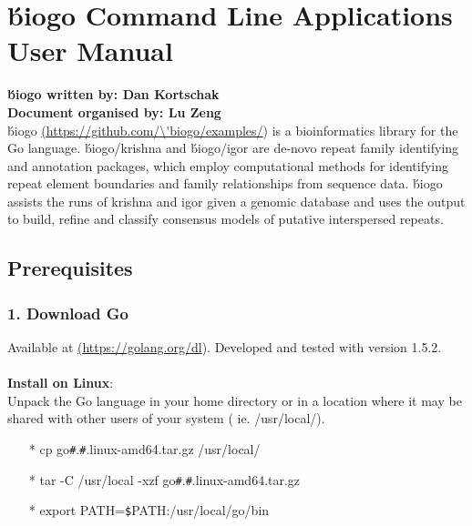 \documentclass[12pt]{report}
\begin{document}
 \sloppy

\author{Author Name}
\date{Day Month Year}


\section*{\'biogo Command Line Applications User Manual}
\textbf{\'biogo written by: Dan Kortschak} \\
\textbf{Document organised by: Lu Zeng} \\

\'biogo \href{<url>}(\url{https://github.com/\'biogo/examples/}) is a bioinformatics library for the Go language. \'biogo/krishna and \'biogo/igor are de-novo repeat family identifying and annotation packages, which employ computational methods for identifying repeat element boundaries and family relationships from sequence data. \'biogo assists the runs of krishna and igor given a genomic database and uses the output to build, refine and classify consensus models of putative interspersed repeats. 


\subsection*{{Prerequisites}}

\subsubsection{1. Download Go }
Available at \href{<url>} (\url{https://golang.org/dl}). Developed and tested with version 1.5.2. \\\\
\textbf{Install on Linux}: \\
Unpack the Go language in your home directory or in a location where it may be shared with other users of your system ( ie. /usr/local/).

\begin{enumerate}
	\item[*] cp go\texttt{\#}.\texttt{\#}.linux-amd64.tar.gz /usr/local/ 
	\item[*] tar -C /usr/local -xzf go\texttt{\#}.\texttt{\#}.linux-amd64.tar.gz
	\item[*] export PATH=\texttt{\$}PATH:/usr/local/go/bin
\end{enumerate}
\end{document}
